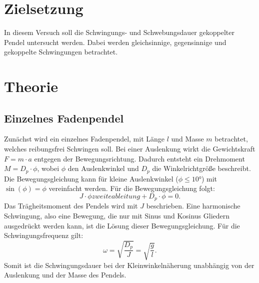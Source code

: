 \section{Zielsetzung}
In diesem Versuch soll die Schwingungs- und Schwebungsdauer gekoppelter Pendel untersucht werden.
Dabei werden gleichsinnige, gegensinnige und gekoppelte Schwingungen betrachtet.
\section{Theorie}
\label{sec:Theorie}
\subsection{Einzelnes Fadenpendel}
Zunächst wird ein einzelnes Fadenpendel, mit Länge $l$ und Masse $m$ betrachtet,
welches reibungsfrei Schwingen soll.
Bei einer Auslenkung wirkt die Gewichtskraft $F = m \cdot a$ entgegen der Bewegungsrichtung.
Dadurch entsteht ein Drehmoment $M = D_p \cdot \phi$, wobei $\phi$ den Auslenkwinkel und $D_p$ die Winkelrichtgröße beschreibt.
Die Bewegungsgleichung kann für kleine Auslenkwinkel ($\phi \leq 10°$) mit $\sin(\phi)= \phi$ vereinfacht werden.
Für die Bewegungsgleichung folgt:
\begin{equation*}
    J \cdot \phi zweite ableitung + D_p \cdot \phi = 0.
\end{equation*}
Das Trägheitsmoment des Pendels wird mit $J$ beschrieben.
Eine harmonische Schwingung, also eine Bewegung, die nur mit Sinus und Kosinus Gliedern ausgedrückt werden kann, ist die Lösung dieser Bewegungsgleichung.
Für die Schwingungsfrequenz gilt:
\begin{equation*}
    \omega = \sqrt{\frac{D_p}{J}} = \sqrt{\frac{g}{l}}.
\end{equation*}
Somit ist die Schwingungsdauer bei der Kleinwinkelnäherung unabhängig von der Auslenkung und der Masse des Pendels.


